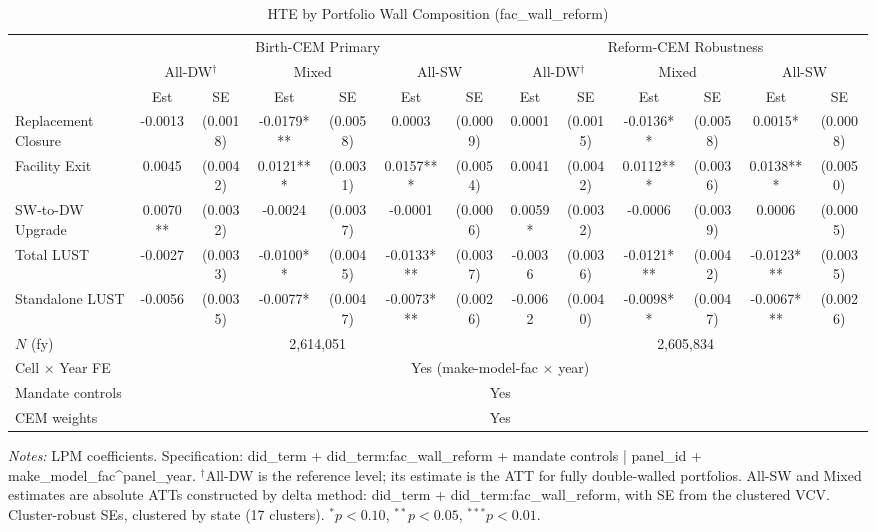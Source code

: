 \begin{table}[htbp]
\centering
\caption{HTE by Portfolio Wall Composition (fac\_wall\_reform)}
\label{tab:hte_wall}
\begin{tabular}{l cc cc cc cc cc cc}
\toprule
 & \multicolumn{6}{c}{Birth-CEM Primary} & \multicolumn{6}{c}{Reform-CEM Robustness} \\
\cmidrule(lr){2-7} \cmidrule(lr){8-13}
 & \multicolumn{2}{c}{All-DW$^{\dagger}$} & \multicolumn{2}{c}{Mixed} & \multicolumn{2}{c}{All-SW} & \multicolumn{2}{c}{All-DW$^{\dagger}$} & \multicolumn{2}{c}{Mixed} & \multicolumn{2}{c}{All-SW} \\
 & Est & SE & Est & SE & Est & SE & Est & SE & Est & SE & Est & SE \\
\midrule
Replacement Closure & -0.0013 & (0.0018) & -0.0179*** & (0.0058) & 0.0003 & (0.0009) & 0.0001 & (0.0015) & -0.0136** & (0.0058) & 0.0015* & (0.0008) \\
Facility Exit & 0.0045 & (0.0042) & 0.0121*** & (0.0031) & 0.0157*** & (0.0054) & 0.0041 & (0.0042) & 0.0112*** & (0.0036) & 0.0138*** & (0.0050) \\
SW-to-DW Upgrade & 0.0070** & (0.0032) & -0.0024 & (0.0037) & -0.0001 & (0.0006) & 0.0059* & (0.0032) & -0.0006 & (0.0039) & 0.0006 & (0.0005) \\
Total LUST & -0.0027 & (0.0033) & -0.0100** & (0.0045) & -0.0133*** & (0.0037) & -0.0036 & (0.0036) & -0.0121*** & (0.0042) & -0.0123*** & (0.0035) \\
Standalone LUST & -0.0056 & (0.0035) & -0.0077* & (0.0047) & -0.0073*** & (0.0026) & -0.0062 & (0.0040) & -0.0098** & (0.0047) & -0.0067*** & (0.0026) \\
\midrule
$N$ (fy) & \multicolumn{6}{c}{2,614,051} & \multicolumn{6}{c}{2,605,834} \\
Cell $\times$ Year FE & \multicolumn{12}{c}{Yes (make-model-fac $\times$ year)} \\
Mandate controls       & \multicolumn{12}{c}{Yes} \\
CEM weights            & \multicolumn{12}{c}{Yes} \\
\bottomrule
\end{tabular}
\begin{minipage}{\linewidth}
\small
\textit{Notes:} LPM coefficients. Specification: did\_term + did\_term:fac\_wall\_reform + mandate controls | panel\_id + make\_model\_fac\^{}panel\_year. $^{\dagger}$All-DW is the reference level; its estimate is the ATT for fully double-walled portfolios. All-SW and Mixed estimates are absolute ATTs constructed by delta method: did\_term + did\_term:fac\_wall\_reform, with SE from the clustered VCV. Cluster-robust SEs, clustered by state (17 clusters). $^{*}p<0.10$, $^{**}p<0.05$, $^{***}p<0.01$.
\end{minipage}
\end{table}

